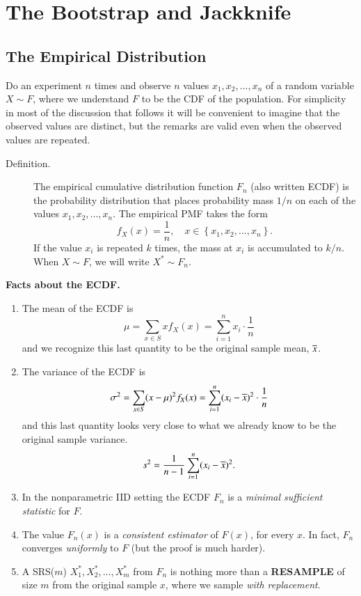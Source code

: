 \documentclass[11pt,english]{scrbook}
\begin{document}
\chapter{The Bootstrap and Jackknife}
\label{sec:org3f1cdac}

\section{The Empirical Distribution}
\label{sec:org5050d2c}

Do an experiment \(n\) times and observe \(n\) values \(x_{1}, x_{2}, ..., x_{n}\) of a random variable \(X \sim F\), where we understand \(F\) to be the CDF of the population. For simplicity in most of the discussion that follows it will be convenient to imagine that the observed values are distinct, but the remarks are valid even when the observed values are repeated. 

\begin{description}
\item[{Definition.}] The empirical cumulative distribution function \(F_{n}\) (also written ECDF) is the probability distribution that places probability mass \(1/n\) on each of the values \(x_{1}, x_{2}, ..., x_{n}\). The empirical PMF takes the form 
\begin{equation*}
f_{X}(x)=\frac{1}{n},\quad x\in\left\{ x_{1},x_{2},...,x_{n}\right\}.
\end{equation*}
If the value \(x_{i}\) is repeated \(k\) times, the mass at \(x_{i}\) is accumulated to \(k/n\).  When \(X \sim F\), we will write \(X^{\ast} \sim F_{n}\).
\end{description}

\bigskip
\textbf{Facts about the ECDF.}

\begin{enumerate}
\item The mean of the ECDF is
\[
   \mu=\sum_{x\in S}xf_{X}(x)=\sum_{i=1}^{n}x_{i}\cdot\frac{1}{n}
   \]
and we recognize this last quantity to be the original sample mean, \(\overline{x}\).

\item The variance of the ECDF is
\[
   \sigma^{2}=\sum_{x\in S}(x-\mu)^{2}f_{X}(x)=\sum_{i=1}^{n}(x_{i}-\overline{x})^{2}\cdot\frac{1}{n}
   \]
and this last quantity looks very close to what we already know to be the original sample variance.
\[
   s^{2}=\frac{1}{n-1}\sum_{i=1}^{n}(x_{i}-\overline{x})^{2}.
   \]
\item In the nonparametric IID setting the ECDF \(F_{n}\) is a \emph{minimal sufficient statistic} for \(F\).

\item The value \(F_{n}(x)\) is a \emph{consistent estimator} of \(F(x)\), for every \(x\).  In fact, \(F_{n}\) converges \emph{uniformly} to \(F\) (but the proof is much harder).

\item A SRS(\(m\)) \(X_{1}^{\ast},X_{2}^{\ast},\ldots,X_{m}^{\ast}\) from \(F_{n}\) is nothing more than a \textbf{RESAMPLE} of size \(m\) from the original sample \(x\), where we sample \emph{with replacement}.
\end{enumerate}
\end{document}
